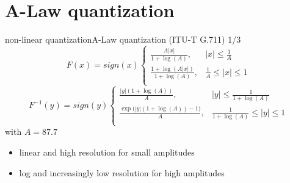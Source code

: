 \section[A-law]{A-Law quantization}
	\begin{frame}{non-linear quantization}{A-Law quantization  (ITU-T G.711) 1/3}
		\begin{equation*}
			F(x)	= sign(x)\left\lbrace
					\begin{array}{ll} 
			          \frac{A|x|}{1+\log(A)}, & |x| \leq \frac{1}{A}\\ 
			          \frac{1+\log(A|x|)}{1+\log(A)}, & \frac{1}{A} \leq |x| \leq 1\\ 
          			\end{array} 
          			\right.
		\end{equation*}
        \bigskip
		\begin{equation*}
			F^{-1}(y)	= sign(y)\left\lbrace
					\begin{array}{ll} 
			          \frac{|y|(1+\log(A))}{A}, & |y| \leq \frac{1}{1+\log(A)}\\ 
			          \frac{\exp\big(|y|(1+\log(A))-1\big)}{A}, & \frac{1}{1+\log(A)} \leq |y| \leq 1\\ 
          			\end{array} 
          			\right.
		\end{equation*}
		\bigskip
		\bigskip
        with $A = 87.7$
        
        \pause
        \begin{itemize}
            \item   linear and high resolution for small amplitudes
            \item   log and increasingly low resolution for high amplitudes
        \end{itemize}
	\end{frame}	

